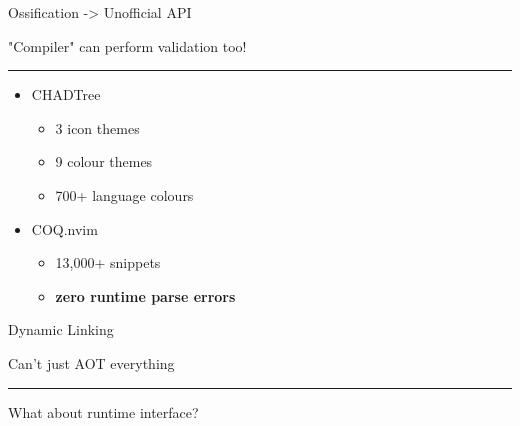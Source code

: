 \documentclass{beamer}
\begin{document}
\begin{frame}{Ossification -> Unofficial API}

	"Compiler" can perform validation too!

	\rule{\textwidth}{0.1em}

	\begin{itemize}

		\item CHADTree

		      \begin{itemize}

			      \item 3 icon themes

			      \item 9 colour themes

			      \item 700+ language colours

		      \end{itemize}

		\item COQ.nvim

		      \begin{itemize}

			      \item 13,000+ snippets

			      \item \textbf{zero runtime parse errors}

		      \end{itemize}

	\end{itemize}

\end{frame}


\begin{frame}{Dynamic Linking}

	Can't just AOT everything

	\rule{\textwidth}{0.1em}

	What about runtime interface?

\end{frame}
\end{document}
